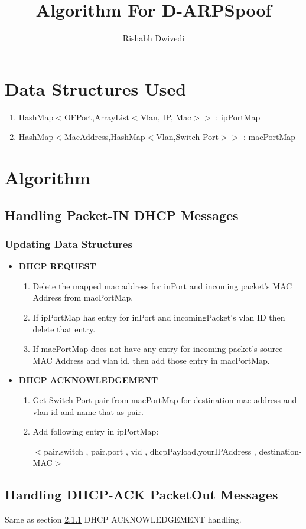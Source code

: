 \documentclass{article}
\author{Rishabh Dwivedi}
\title{Algorithm For D-ARPSpoof}
\begin{document}
\maketitle
\section{Data Structures Used}

\begin{enumerate}
	\item HashMap$<$OFPort,ArrayList$<$Vlan, IP, Mac$>$$>$ : ipPortMap
	\item HashMap$<$MacAddress,HashMap$<$Vlan,Switch-Port$>$$>$ : macPortMap
\end{enumerate}

\section{Algorithm}


\subsection{Handling Packet-IN DHCP Messages}


\subsubsection{Updating Data Structures} \label{dhcp-ds}


\begin{itemize}
	\item \textbf{DHCP REQUEST}

		\begin{enumerate}
			\item Delete the mapped mac address for inPort and incoming packet's MAC Address from macPortMap.
			\item If ipPortMap has entry for inPort and incomingPacket's vlan ID then delete that entry.
			\item If macPortMap does not have any entry for incoming packet's source MAC Address and vlan id, then add those entry in macPortMap.
		\end{enumerate}
	\item \textbf{DHCP ACKNOWLEDGEMENT} \label{dhcp-ack}
		\begin{enumerate}
			\item Get Switch-Port pair from macPortMap for destination mac address and vlan id and name that as pair.
			\item Add following entry in ipPortMap:

				\small{
				$<$pair.switch ,  pair.port , vid , dhcpPayload.yourIPAddress , destination-MAC$>$
				}
		\end{enumerate}

\end{itemize}






\subsection{Handling DHCP-ACK PacketOut Messages}

Same as section \ref{dhcp-ds} DHCP ACKNOWLEDGEMENT handling.


\printbibliography
\end{document}
